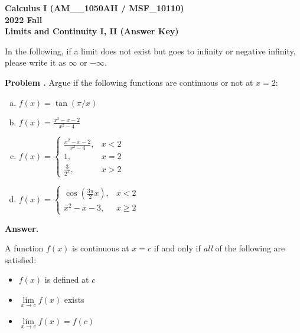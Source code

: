 \documentclass[11pt,letterpaper]{article}
\newcounter{problem}
\newcommand{\problem}{
	\stepcounter{problem}%
	\noindent \textbf{Problem \theproblem. }%
}
\newcommand{\answer}{\noindent \textbf{Answer. }}
\begin{document}
\noindent\textbf{\large Calculus I (AM\_\_1050AH / MSF\_10110) \\ 2022 Fall \\ Limits and Continuity I, II (Answer Key)}

\bigskip

In the following, if a limit does not exist but goes to infinity or negative infinity, please write it as $\infty$ or $-\infty$.

\bigskip


\problem Argue if the following functions are continuous or not at $x = 2$:
\begin{enumerate}[(a)]
    \item $f(x) = \tan(\pi/x)$
    \item $f(x) = \frac{x^2-x-2}{x^2-4}$
    \item $f(x) = \left\{\begin{array}{lr}
        \frac{x^2-x-2}{x^2-4}, & x < 2\\
        1, & x = 2\\
        \frac{3}{2^x}, & x > 2
        \end{array}\right.$
    \item $f(x) = \left\{\begin{array}{lr}
        \cos\left(\frac{3\pi}{2}x\right), & x < 2\\
        x^2-x-3, & x \ge 2
        \end{array}\right.$
\end{enumerate}\vspace{6mm}

\answer

\medskip

\noindent A function $f(x)$ is continuous at $x=c$ if and only if \textit{all} of the following are satisfied:
\begin{itemize}
    \item $f(x)$ is defined at $c$
    \item $\lim\limits_{x \to  c} f(x)$ exists
    \item $\lim\limits_{x \to  c} f(x) = f(c)$
\end{itemize}
\end{document}
